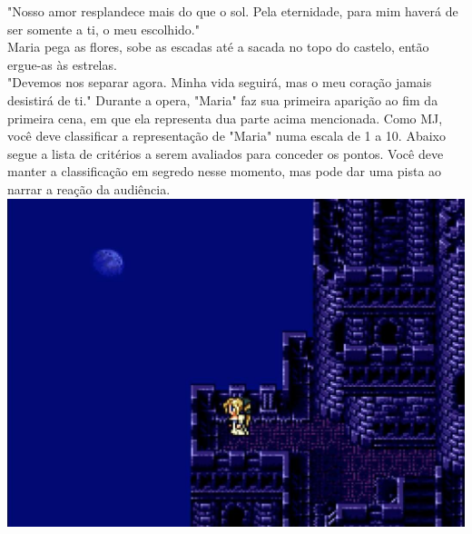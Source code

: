 "Nosso amor resplandece mais do que o sol. Pela eternidade, para mim haverá de ser somente a ti, o meu escolhido."\vspace{0.2cm}\\ 
Maria pega as flores, sobe as escadas até a sacada no topo do castelo, então ergue-as às estrelas.\vspace{0.2cm}\\
"Devemos nos separar agora. Minha vida seguirá, mas o meu coração jamais desistirá de ti."
%
%
\vfill
%
Durante a opera, "Maria" faz sua primeira aparição ao fim da primeira cena, em que ela representa dua parte acima mencionada.
Como MJ, você deve classificar a representação de "Maria" numa escala de 1 a 10.
Abaixo segue a lista de critérios a serem avaliados para conceder os pontos.
Você deve manter a classificação em segredo nesse momento, mas pode dar uma pista ao narrar a reação da audiência.
%
\clearpage
%
\includegraphics[width=\columnwidth]{./art/mariaanddraco/maria.jpg}\\
%
\vfill
%
%
\vfill
%

